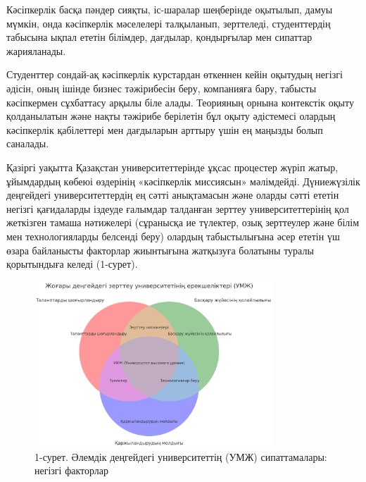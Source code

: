 \begin{multicols}{2}
Кәсіпкерлік басқа пәндер сияқты, іс-шаралар шеңберінде оқытылып, дамуы
мүмкін, онда кәсіпкерлік мәселелері талқыланып, зерттеледі,
студенттердің табысына ықпал ететін білімдер, дағдылар, қондырғылар мен
сипаттар жарияланады.

Студенттер сондай-ақ кәсіпкерлік курстардан өткеннен кейін оқытудың
негізгі әдісін, оның ішінде бизнес тәжірибесін беру, компанияға бару,
табысты кәсіпкермен сұхбаттасу арқылы біле алады. Теорияның орнына
контекстік оқыту қолданылатын және нақты тәжірибе берілетін бұл оқыту
әдістемесі олардың кәсіпкерлік қабілеттері мен дағдыларын арттыру үшін
ең маңызды болып саналады.

Қазіргі уақытта Қазақстан университеттерінде ұқсас процестер жүріп
жатыр, ұйымдардың көбеюі өздерінің «кәсіпкерлік миссиясын» мәлімдейді.
Дүниежүзілік деңгейдегі университеттердің ең сәтті анықтамасын және
оларды сәтті ететін негізгі қағидаларды іздеуде ғалымдар талданған
зерттеу университеттерінің қол жеткізген тамаша нәтижелері (сұранысқа ие
түлектер, озық зерттеулер және білім мен технологияларды белсенді беру)
олардың табыстылығына әсер ететін үш өзара байланысты факторлар
жиынтығына жатқызуға болатыны туралы қорытындыға келеді (1-сурет).
\end{multicols}


\begin{figure}[H]
	\centering
	\includegraphics[width=0.8\textwidth]{media/ekon/image4}
	\caption*{1-сурет. Әлемдік деңгейдегі университеттің (УМЖ) сипаттамалары:
  негізгі факторлар}
\end{figure}


